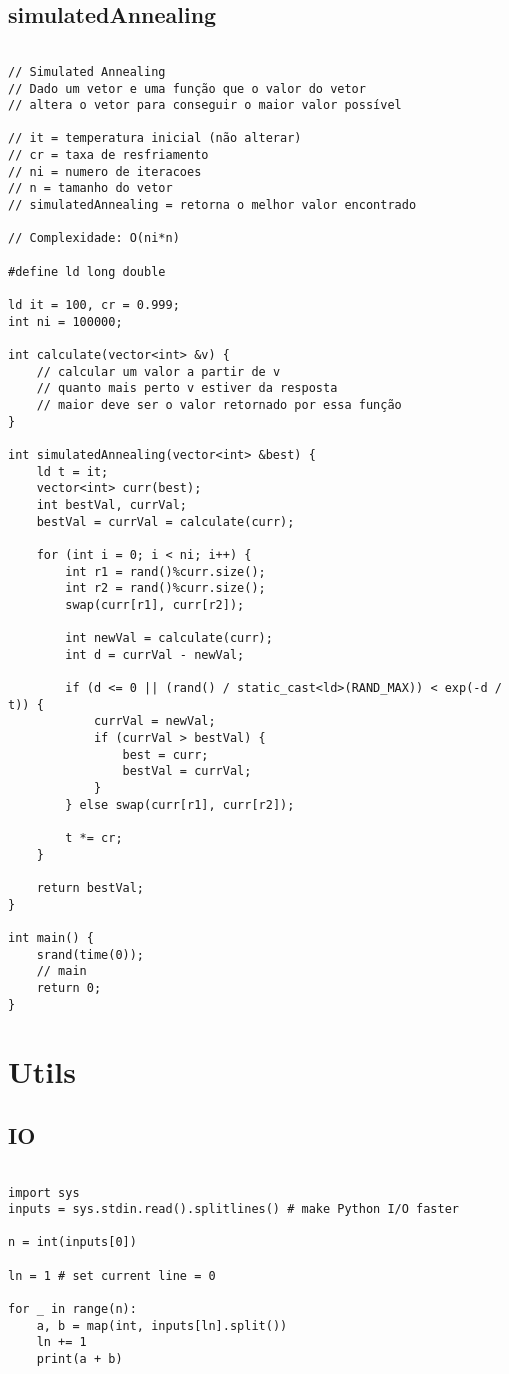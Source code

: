 \documentclass[landscape,twocolumn,10pt,a4paper]{article}
\begin{document}
\subsection{simulatedAnnealing}
\begin{verbatim}

// Simulated Annealing
// Dado um vetor e uma função que o valor do vetor
// altera o vetor para conseguir o maior valor possível

// it = temperatura inicial (não alterar)
// cr = taxa de resfriamento
// ni = numero de iteracoes
// n = tamanho do vetor
// simulatedAnnealing = retorna o melhor valor encontrado

// Complexidade: O(ni*n)

#define ld long double

ld it = 100, cr = 0.999;
int ni = 100000;

int calculate(vector<int> &v) {
    // calcular um valor a partir de v
    // quanto mais perto v estiver da resposta
    // maior deve ser o valor retornado por essa função
}

int simulatedAnnealing(vector<int> &best) {
    ld t = it;
    vector<int> curr(best);
    int bestVal, currVal;
    bestVal = currVal = calculate(curr);

    for (int i = 0; i < ni; i++) {
        int r1 = rand()%curr.size();
        int r2 = rand()%curr.size();
        swap(curr[r1], curr[r2]);

        int newVal = calculate(curr);
        int d = currVal - newVal;

        if (d <= 0 || (rand() / static_cast<ld>(RAND_MAX)) < exp(-d / t)) {
            currVal = newVal;
            if (currVal > bestVal) {
                best = curr;
                bestVal = currVal;
            }
        } else swap(curr[r1], curr[r2]);
        
        t *= cr;
    }
    
    return bestVal;
}

int main() {
    srand(time(0));
    // main
    return 0;
}

\end{verbatim}

\section{Utils}
\subsection{IO}
\begin{verbatim}

import sys
inputs = sys.stdin.read().splitlines() # make Python I/O faster

n = int(inputs[0])

ln = 1 # set current line = 0

for _ in range(n):
	a, b = map(int, inputs[ln].split())
	ln += 1
	print(a + b)

\end{verbatim}
\end{document}
